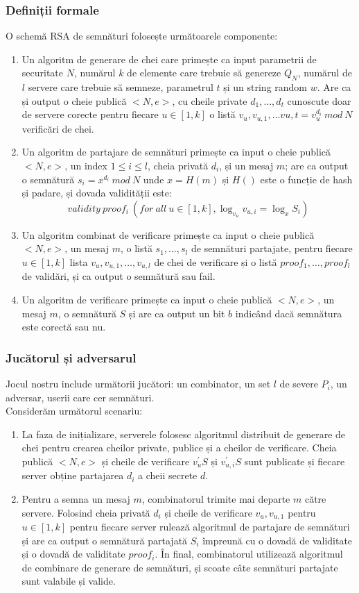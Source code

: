 \documentclass[12]{report}
\begin{document}
\subsubsection{Definiții formale}
O schemă RSA de semnături folosește următoarele componente:
\begin{enumerate}
\item Un algoritm de generare de chei care primește ca input parametrii de securitate $N$, numărul $k$ de elemente care trebuie să genereze $Q_N$, numărul de $l$ servere care trebuie să semneze, parametrul $t$ și un string random $w$. Are ca și output o cheie publică $<N,e>$, cu cheile private $d_1, \dots ,d_t$ cunoscute doar de servere corecte pentru fiecare $u \in [1,k]$ o listă $v_u,v_{u,1}, \dots v{u,t}=v_{u}^{d_i} \ mod \ N$ verificări de chei. 
\item Un algoritm de partajare de semnături primește ca input o cheie publică $<N,e>$, un index $ 1\leqslant i \leqslant l$, cheia privată $d_i$, și un mesaj $m$; are ca output o semnătură $s_i = x^{d_i} \ mod \ N$ unde $x=H(m)$ și $H()$ este o funcție de hash și padare, și dovada validității este:
$$ validity \ proof_i \ (for \ all \ u \in [1,k], \log_{v_u} v_{u,i}=\log_x S_i)$$
\item Un algoritm combinat de verificare primește ca input o cheie publică $<N,e>$, un mesaj $m$, o listă $s_1, \dots ,s_l$ de semnături partajate, pentru fiecare $u \in [1,k]$ lista $v_u,v_{u,1}, \dots ,v_{u,l}$ de chei de verificare și o listă $proof_1, \dots ,proof_l$ de validări, și ca output o semnătură sau fail.
\item Un algoritm de verificare primește ca input o cheie publică $<N,e>$, un mesaj $m$, o semnătură $S$ și are ca output un bit $b$ indicând dacă semnătura este corectă sau nu.
\end{enumerate}
\subsubsection{Jucătorul și adversarul}
Jocul nostru include următorii jucători: un combinator, un set $l$ de severe $P_i$, un adversar, userii care cer semnături.\\
Considerăm următorul scenariu: \\
\begin{enumerate}
\item La faza de inițializare, serverele folosesc algoritmul distribuit de generare de chei pentru crearea cheilor private, publice și a cheilor de verificare. Cheia publică $<N,e>$ și cheile de verificare $v_{u}^{'}S$ și $v_{u,i}^{'}S$ sunt publicate și fiecare server obține partajarea $d_i$ a cheii secrete $d$.
\item Pentru a semna un mesaj $m$, combinatorul trimite mai departe $m$ către servere. Folosind cheia privată $d_i$ și cheile de verificare $v_u,v_{u,1}$ pentru $u \in [1,k]$ pentru fiecare server rulează algoritmul de partajare de semnături și are ca output o semnătură partajată $S_i$ împreună cu o dovadă de validitate și o dovadă de validitate $proof_i$. În final, combinatorul utilizează algoritmul de combinare de generare de semnături, și scoate câte semnături partajate sunt valabile și valide.
\end{enumerate}
\end{document}
